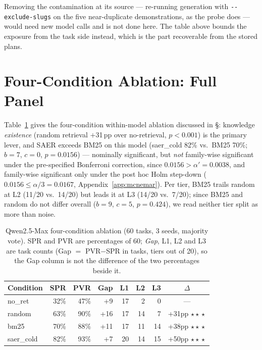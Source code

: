 \documentclass[letterpaper]{article} %
\newcommand{\appref}[1]{Appendix~\ref{#1}}
\newcommand{\bodyref}[1]{\getrefnumber{#1}}
\newcommand{\sigC}{$\star\!\star\!\star$}
\begin{document}
Removing the contamination at its source --- re-running generation with
\texttt{-{}-exclude-slugs} on the five near-duplicate demonstrations, as the
probe does --- would need new model calls and is not done here.  The table
above bounds the exposure from the task side instead, which is the part
recoverable from the stored plans.

\section{Four-Condition Ablation: Full Panel}
\label{app:perseed}
\label{app:ablation}

Table~\ref{tab:ablation_5cond} gives the four-condition within-model
ablation discussed in \S\bodyref{sec:ablation}: knowledge \emph{existence} (random retrieval
$+$31\,pp over no-retrieval, $p{<}0.001$) is the primary lever, and SAER
exceeds BM25 on this model (saer\_cold 82\% vs.\ BM25 70\%; $b{=}7$,
$c{=}0$, $p{=}0.0156$) --- nominally significant, but \emph{not} family-wise
significant under the pre-specified Bonferroni correction, since
$0.0156{>}\alpha'{=}0.0038$, and family-wise significant only under the post
hoc Holm step-down
($0.0156{\leq}\alpha/3{=}0.0167$, \appref{app:mcnemar}).  Per tier, BM25 trails random
at L2 (11/20 vs.\ 14/20) but leads it at L3 (14/20 vs.\ 7/20); since BM25 and
random do not differ overall ($b{=}9$, $c{=}5$, $p{=}0.424$), we read neither
tier split as more than noise.

\begin{table}[tbp]
\centering
\caption{Qwen2.5-Max four-condition ablation (60 tasks, 3 seeds, majority
vote).  SPR and PVR are percentages of 60; \emph{Gap}, L1, L2 and L3 are task
counts (Gap $=$ PVR$-$SPR in tasks, tiers out of 20), so the Gap column is not
the difference of the two percentages beside it.}
\label{tab:ablation_5cond}
\small
\begin{tabular}{lrrrrrrc}
\toprule
Condition & SPR & PVR & Gap & L1 & L2 & L3 & $\Delta$ \\
\midrule
no\_ret    & 32\% & 47\% & +9  & 17 & 2  & 0  & ---        \\
random     & 63\% & 90\% & +16 & 17 & 14 & 7  & +31pp \sigC \\
bm25       & 70\% & 88\% & +11 & 17 & 11 & 14 & +38pp \sigC \\
saer\_cold & 82\% & 93\% & +7  & 20 & 14 & 15 & +50pp \sigC \\
\bottomrule
\end{tabular}
\end{table}
\end{document}
